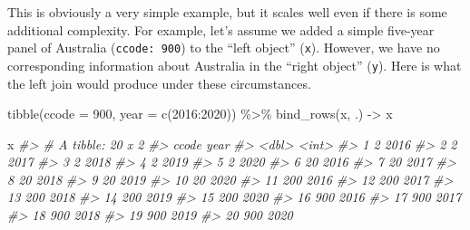 \documentclass[
  11pt,
]{article}
\newenvironment{Shaded}{\begin{snugshade}}{\end{snugshade}}
\newcommand{\AttributeTok}[1]{\textcolor[rgb]{0.77,0.63,0.00}{#1}}
\newcommand{\CommentTok}[1]{\textcolor[rgb]{0.56,0.35,0.01}{\textit{#1}}}
\newcommand{\DecValTok}[1]{\textcolor[rgb]{0.00,0.00,0.81}{#1}}
\newcommand{\FunctionTok}[1]{\textcolor[rgb]{0.00,0.00,0.00}{#1}}
\newcommand{\NormalTok}[1]{#1}
\newcommand{\OtherTok}[1]{\textcolor[rgb]{0.56,0.35,0.01}{#1}}
\newcommand{\SpecialCharTok}[1]{\textcolor[rgb]{0.00,0.00,0.00}{#1}}
\begin{document}
This is obviously a very simple example, but it scales well even if there is some additional complexity. For example, let's assume we added a simple five-year panel of Australia (\texttt{ccode:\ 900}) to the ``left object'' (\texttt{x}). However, we have no corresponding information about Australia in the ``right object'' (\texttt{y}). Here is what the left join would produce under these circumstances.

\begin{Shaded}
\begin{Highlighting}[]
\FunctionTok{tibble}\NormalTok{(}\AttributeTok{ccode =} \DecValTok{900}\NormalTok{,}
       \AttributeTok{year =} \FunctionTok{c}\NormalTok{(}\DecValTok{2016}\SpecialCharTok{:}\DecValTok{2020}\NormalTok{)) }\SpecialCharTok{\%\textgreater{}\%}
  \FunctionTok{bind\_rows}\NormalTok{(x, .) }\OtherTok{{-}\textgreater{}}\NormalTok{ x}

\NormalTok{x}
\CommentTok{\#\textgreater{} \# A tibble: 20 x 2}
\CommentTok{\#\textgreater{}    ccode  year}
\CommentTok{\#\textgreater{}    \textless{}dbl\textgreater{} \textless{}int\textgreater{}}
\CommentTok{\#\textgreater{}  1     2  2016}
\CommentTok{\#\textgreater{}  2     2  2017}
\CommentTok{\#\textgreater{}  3     2  2018}
\CommentTok{\#\textgreater{}  4     2  2019}
\CommentTok{\#\textgreater{}  5     2  2020}
\CommentTok{\#\textgreater{}  6    20  2016}
\CommentTok{\#\textgreater{}  7    20  2017}
\CommentTok{\#\textgreater{}  8    20  2018}
\CommentTok{\#\textgreater{}  9    20  2019}
\CommentTok{\#\textgreater{} 10    20  2020}
\CommentTok{\#\textgreater{} 11   200  2016}
\CommentTok{\#\textgreater{} 12   200  2017}
\CommentTok{\#\textgreater{} 13   200  2018}
\CommentTok{\#\textgreater{} 14   200  2019}
\CommentTok{\#\textgreater{} 15   200  2020}
\CommentTok{\#\textgreater{} 16   900  2016}
\CommentTok{\#\textgreater{} 17   900  2017}
\CommentTok{\#\textgreater{} 18   900  2018}
\CommentTok{\#\textgreater{} 19   900  2019}
\CommentTok{\#\textgreater{} 20   900  2020}


\end{Highlighting}
\end{Shaded}
\end{document}
